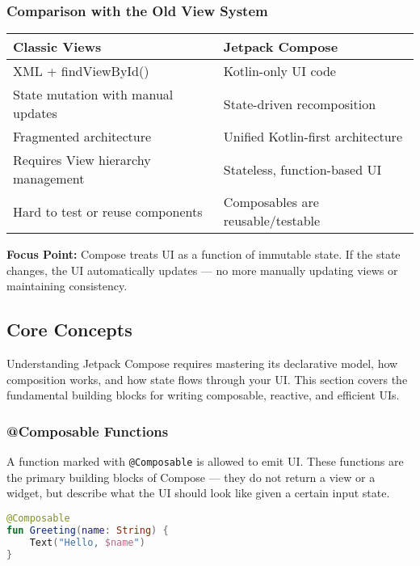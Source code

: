 \documentclass[a4paper,12pt]{article}
\begin{document}
\subsubsection{Comparison with the Old View System}
\begin{table}[h!]
\centering
\begin{tabular}{|l|l|}
\hline
\textbf{Classic Views} & \textbf{Jetpack Compose} \\
\hline
XML + findViewById() & Kotlin-only UI code \\
State mutation with manual updates & State-driven recomposition \\
Fragmented architecture & Unified Kotlin-first architecture \\
Requires View hierarchy management & Stateless, function-based UI \\
Hard to test or reuse components & Composables are reusable/testable \\
\hline
\end{tabular}
\end{table}

\textbf{Focus Point:} Compose treats UI as a function of immutable state. If the state changes, the UI automatically updates — no more manually updating views or maintaining consistency.


\subsection{Core Concepts}
\label{subsec:compose_core_concepts}

Understanding Jetpack Compose requires mastering its declarative model, how composition works, and how state flows through your UI. This section covers the fundamental building blocks for writing composable, reactive, and efficient UIs.

\subsubsection{@Composable Functions}
A function marked with \texttt{@Composable} is allowed to emit UI. These functions are the primary building blocks of Compose — they do not return a view or a widget, but describe what the UI should look like given a certain input state.

\begin{lstlisting}[language=Kotlin]
@Composable
fun Greeting(name: String) {
    Text("Hello, $name")
}
\end{lstlisting}
\end{document}
